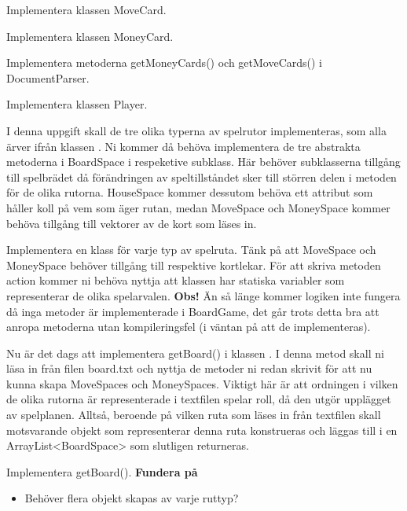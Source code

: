 \Subtask Implementera klassen MoveCard.

\Subtask Implementera klassen MoneyCard.

\Subtask Implementera metoderna getMoneyCards() och getMoveCards() i DocumentParser.

\Subtask Implementera klassen Player.

\Task I denna uppgift skall de tre olika typerna av spelrutor implementeras, som alla ärver ifrån klassen . Ni kommer då behöva implementera de tre abstrakta metoderna i BoardSpace i respeketive subklass. Här behöver subklasserna tillgång till spelbrädet då förändringen av speltillståndet sker till störren delen i metoden  för de olika rutorna. HouseSpace kommer dessutom behöva ett attribut som håller koll på vem som äger rutan, medan MoveSpace och MoneySpace kommer behöva tillgång till vektorer av de kort som läses in.

\Subtask Implementera en klass för varje typ av spelruta. Tänk på att MoveSpace och MoneySpace behöver tillgång till respektive kortlekar.
För att skriva metoden action kommer ni behöva nyttja att klassen  har statiska variabler som representerar de olika spelarvalen.
\newline
\newline
\noindent
\textbf{Obs!} Än så länge kommer logiken inte fungera då inga metoder är implementerade i BoardGame, det går trots detta bra att anropa metoderna utan kompileringsfel (i väntan på att de implementeras).



\Task Nu är det dags att implementera getBoard() i klassen . I denna metod skall ni läsa in från filen board.txt och nyttja de metoder ni redan skrivit för att nu kunna skapa MoveSpaces och MoneySpaces. Viktigt här är att ordningen i vilken de olika rutorna är representerade i textfilen spelar roll, då den utgör upplägget av spelplanen. Alltså, beroende på vilken ruta som läses in från textfilen skall motsvarande objekt som representerar denna ruta konstrueras och läggas till i en ArrayList<BoardSpace> som slutligen returneras.


\Subtask Implementera getBoard().
\newline
\newline
\textbf{Fundera på}
\begin{itemize}
\item Behöver flera objekt skapas av varje ruttyp?
\end{itemize}

